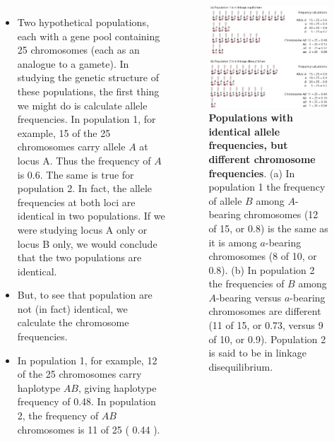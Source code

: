 \documentclass[11pt,dvipsnames,ignorenonframetext,aspectratio=169]{beamer}
\begin{document}
\begin{frame}{}
\protect\hypertarget{section-27}{}
\begin{columns}[T,onlytextwidth]
\begin{itemize}
\scriptsize
\item Two hypothetical populations, each with a gene pool containing 25 chromosomes (each as an analogue to a gamete). In studying the genetic structure of these populations, the first thing we might do is calculate allele frequencies. In population 1, for example, 15 of the 25 chromosomes carry allele $A$ at locus A. Thus the frequency of $A$ is 0.6. The same is true for population 2. In fact, the allele frequencies at both loci are identical in two populations. If we were studying locus A only or locus B only, we would conclude that the two populations are identical.
\item But, to see that population are not (in fact) identical, we calculate the chromosome frequencies.
\item In population 1, for example, 12 of the 25 chromosomes carry haplotype $AB$, giving haplotype frequency of 0.48. In population 2, the frequency of $AB$ chromosomes is 11 of 25 ( 0.44 ).
\end{itemize}


\begin{figure}
\includegraphics[width=0.82\linewidth]{../images/linkage_disequilibrium_two_pops} \caption{\textbf{Populations with identical allele frequencies, but different chromosome frequencies}. (a) In population 1 the frequency of allele $B$ among $A$-bearing chromosomes (12 of 15, or 0.8) is the same as it is among $a$-bearing chromosomes (8 of 10, or 0.8). (b) In population 2 the frequencies of $B$ among $A$-bearing versus $a$-bearing chromosomes are different (11 of 15, or 0.73, versus 9 of 10, or 0.9). Population 2 is said to be in linkage disequilibrium.}\label{fig:linkage-disequlibrium-example}
\end{figure}

\end{columns}
\end{frame}
\end{document}

